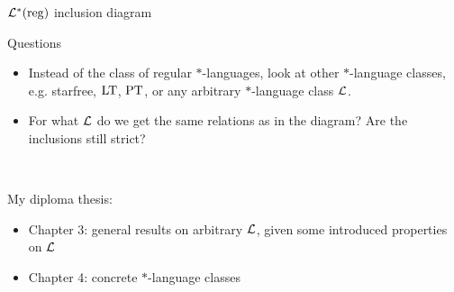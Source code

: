 \documentclass[
	handout,
	notheorems,noamsthm]{beamer}
\begin{document}
\begin{frame}{$\mathcal{L}^*(\textup{\textrm{reg}})$ inclusion diagram}
\begin{center}
\end{center}
\end{frame}

\begin{frame}[<+->]{Questions}
\begin{itemize}
\item Instead of the class of regular $*$-languages, look at other $*$-language classes, e.g. starfree, $\textup{\textrm{LT}}$, $\textup{\textrm{PT}}$, or any arbitrary $*$-language class $\mathcal{L}$.
\item For what $\mathcal{L}$ do we get the same relations as in the diagram? Are the inclusions still strict?
\end{itemize}
\

My diploma thesis:
\begin{itemize}
\item Chapter 3: general results on arbitrary $\mathcal{L}$, given some introduced properties on $\mathcal{L}$
\item Chapter 4: concrete $*$-language classes
\end{itemize}
\end{frame}
\end{document}

